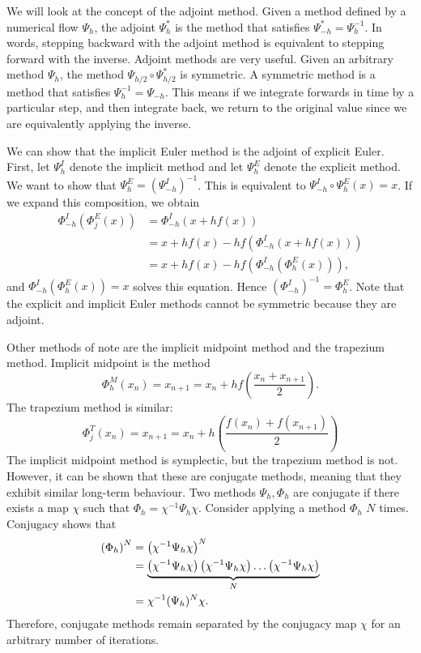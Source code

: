 \documentclass{report}
\theoremstyle{exampstyle} \newtheorem{example}[theorem]{Example}
\theoremstyle{exampstyle} \newtheorem{remark}[theorem]{Remark}
\theoremstyle{exampstyle} \newtheorem{definition}[theorem]{Definition}
\theoremstyle{exampstyle} \newtheorem{lemma}[theorem]{Lemma}
\begin{document}
We will look at the concept of the adjoint method. Given a method defined by a numerical flow $\Psi_h$,
the adjoint $\Psi^*_h$ is the method that satisfies $\Psi^*_{-h} = \Psi^{-1}_h$.
In words, stepping backward with the adjoint method is equivalent to stepping forward with the inverse.
Adjoint methods are very useful. Given an arbitrary method $\Psi_h$,
the method $\Psi_{h/2} \circ \Psi_{h/2}^*$ is symmetric.
A symmetric method is a method that satisfies $\Psi_h^{-1} = \Psi_{-h}$.
This means if we integrate forwards in time by a particular step, and then integrate back,
we return to the original value since we are equivalently applying the inverse.

We can show that the implicit Euler method is the adjoint of explicit Euler.
First, let $\Psi_h^I$ denote the implicit method and let $\Psi_h^E$ denote the explicit method.
We want to show that $\Psi_h^E = (\Psi_{-h}^I)^{-1}$.
This is equivalent to $\Psi_{-h}^I \circ \Psi_h^E (x) = x$.
If we expand this composition, we obtain
\begin{align*}
	\Phi_{-h}^I \left( \Phi_j^E  (x) \right) &= \Phi_{-h}^I \left( x + h f(x) \right) \\
	&= x + h f(x) - h f\left( \Phi_{-h}^I \left( x + h f(x) \right) \right) \\
	&= x + h f(x) - h f\left( \Phi_{-h}^I \left( \Phi_h^E (x) \right) \right),
\end{align*}
and $\Phi_{-h}^I (\Phi_h^E (x)) = x$ solves this equation. Hence $(\Phi_{-h}^I)^{-1} = \Phi_h^E$.
Note that the explicit and implicit Euler methods cannot be symmetric because they are adjoint.

Other methods of note are the implicit midpoint method and the trapezium method. Implicit midpoint is the method
\begin{equation*}
	\Phi_h^M (x_n) = x_{n+1} = x_n + hf\left(\frac{x_n + x_{n+1}}{2}\right).
\end{equation*}
The trapezium method is similar:
\begin{equation*}
	\Phi_j^T (x_n) = x_{n+1} = x_n + h \left(\frac{f(x_n) + f(x_{n+1})}{2}\right)
\end{equation*}
The implicit midpoint method is symplectic, but the trapezium method is not.
However, it can be shown that these are conjugate methods, meaning that they exhibit similar long-term behaviour.
Two methods $\Psi_h, \Phi_h$ are conjugate if there exists a map $\chi$ such that $\Phi_h = \chi^{-1} \Psi_h \chi$.
Consider applying a method $\Phi_h$ $N$ times. Conjugacy shows that
\begin{align*}
	\left(\Phi_h\right)^N &= \left(\chi^{-1} \Psi_h \chi\right)^N \\
	&= \underbrace{\left(\chi^{-1} \Psi_h \chi \right)\left(\chi^{-1} \Psi_h \chi \right) \mathellipsis \left(\chi^{-1} \Psi_h \chi\right)}_{N} \\
	&= \chi^{-1} (\Psi_h)^N \chi.
\end{align*}
Therefore, conjugate methods remain separated by the conjugacy map $\chi$ for an arbitrary number of iterations.
\end{document}
